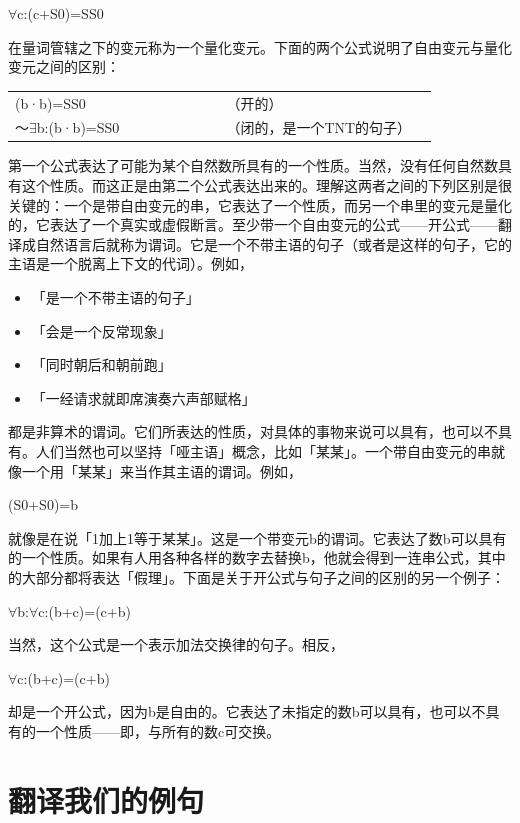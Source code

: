 \documentclass[
  12pt,
  twoside,
  openright,
  oldfontcommands,
]{memoir}
\providecommand{\tightlist}{%
  \setlength{\itemsep}{0pt}\setlength{\parskip}{0pt}}
\begin{document}
$\forall$c:(c+S0)=SS0

在量词管辖之下的变元称为一个量化变元。下面的两个公式说明了自由变元与量化变元之间的区别：

\begin{longtable}[]{>{\raggedright\arraybackslash}p{0.47\linewidth} >{\raggedright\arraybackslash}p{0.47\linewidth}}
\toprule\noalign{}
\endhead
\bottomrule\noalign{}
\endlastfoot
(b·b)=SS0 & （开的） \\
～$\exists$b:(b·b)=SS0 & （闭的，是一个TNT的句子） \\
\end{longtable}

第一个公式表达了可能为某个自然数所具有的一个性质。当然，没有任何自然数具有这个性质。而这正是由第二个公式表达出来的。理解这两者之间的下列区别是很关键的：一个是带自由变元的串，它表达了一个性质，而另一个串里的变元是量化的，它表达了一个真实或虚假断言。至少带一个自由变元的公式------开公式------翻译成自然语言后就称为谓词。它是一个不带主语的句子（或者是这样的句子，它的主语是一个脱离上下文的代词）。例如，

\begin{itemize}
\tightlist
\item
  「是一个不带主语的句子」
\item
  「会是一个反常现象」
\item
  「同时朝后和朝前跑」
\item
  「一经请求就即席演奏六声部赋格」
\end{itemize}

都是非算术的谓词。它们所表达的性质，对具体的事物来说可以具有，也可以不具有。人们当然也可以坚持「哑主语」概念，比如「某某」。一个带自由变元的串就像一个用「某某」来当作其主语的谓词。例如，

(S0+S0)=b

就像是在说「1加上1等于某某」。这是一个带变元b的谓词。它表达了数b可以具有的一个性质。如果有人用各种各样的数字去替换b，他就会得到一连串公式，其中的大部分都将表达「假理」。下面是关于开公式与句子之间的区别的另一个例子：

$\forall$b:$\forall$c:(b+c)=(c+b)

当然，这个公式是一个表示加法交换律的句子。相反，

$\forall$c:(b+c)=(c+b)

却是一个开公式，因为b是自由的。它表达了未指定的数b可以具有，也可以不具有的一个性质------即，与所有的数c可交换。

\section{翻译我们的例句}
\end{document}

